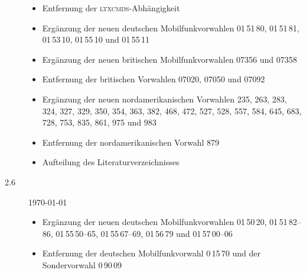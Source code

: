 \documentclass[numbers=noenddot]{scrreprt}
\newcommand*\Paket[1]{\textsc{#1}}
\begin{document}
\begin{description}
\begin{itemize}
\item Entfernung der \Paket{ltxcmds}-Abhängigkeit
\item Ergänzung der neuen deutschen Mobilfunkvorwahlen 01\,51\,80, 01\,51\,81, 01\,53\,10, 01\,55\,10 und 01\,55\,11
\item Ergänzung der neuen britischen Mobilfunkvorwahlen 07356 und 07358
\item Entfernung der britischen Vorwahlen 07020, 07050 und 07092
\item Ergänzung der neuen nordamerikanischen Vorwahlen 235, 263, 283, 324, 327, 329, 350, 354, 363, 382, 468, 472, 527, 528, 557, 584, 645, 683, 728, 753, 835, 861, 975 und 983
\item Entfernung der nordamerikanischen Vorwahl 879
\item Aufteilung des Literaturverzeichnisses
\end{itemize}
\item[2.6] \today
\begin{itemize}
\item Ergänzung der neuen deutschen Mobilfunkvorwahlen 01\,50\,20, 01\,51\,82--86, 01\,55\,50--65, 01\,55\,67--69, 01\,56\,79 und 01\,57\,00--06
\item Entfernung der deutschen Mobilfunkvorwahl 0\,15\,70 und der Sondervorwahl  0\,90\,09
\end{itemize}
\end{description}
\end{document}
